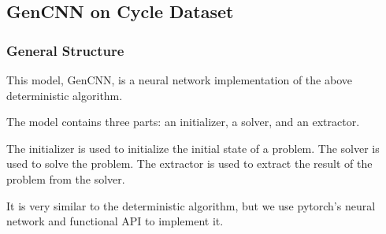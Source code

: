 \documentclass{article}
\begin{document}
\subsection{GenCNN on Cycle Dataset}


\subsubsection{General Structure}

This model, GenCNN, is a neural network implementation of the above deterministic algorithm.

The model contains three parts: an initializer, a solver, and an extractor.

The initializer is used to initialize the initial state of a problem. 
The solver is used to solve the problem.
The extractor is used to extract the result of the problem from the solver.

It is very similar to the deterministic algorithm, but we use pytorch's neural network and functional API to implement it.
\end{document}
